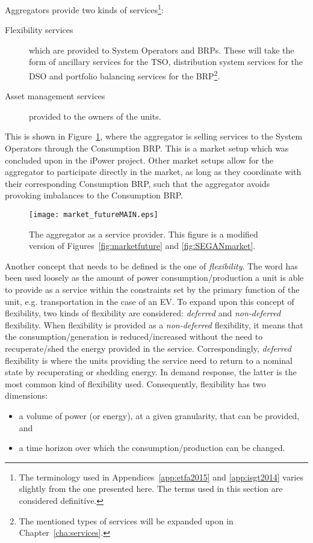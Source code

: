 Aggregators provide two kinds of services\footnote{The terminology used in Appendices~\ref{app:etfa2015} and \ref{app:isgt2014} varies slightly from the one presented here. The terms used in this section are considered definitive.}:
\begin{description}
	\item[Flexibility services] which are provided to System Operators and BRPs. These will take the form of ancillary services for the TSO, distribution system services for the DSO and portfolio balancing services for the BRP\footnote{The mentioned types of services will be expanded upon in Chapter~\ref{cha:services}.}.
	\item[Asset management services] provided to the owners of the units.
\end{description}
This is shown in Figure~\ref{fig:market_futureMAIN}, where the aggregator is selling services to the System Operators through the Consumption BRP. This is a market setup which was concluded upon in the iPower project. Other market setups allow for the aggregator to participate directly in the market, as long as they coordinate with their corresponding Consumption BRP, such that the aggregator avoids provoking imbalances to the Consumption BRP.
\begin{figure}[htbp!]
\centering
\texttt{[image: market\_futureMAIN.eps]}
\caption{The aggregator as a service provider. This figure is a modified version of Figures~\ref{fig:marketfuture} and \ref{fig:SEGANmarket}.}
\label{fig:market_futureMAIN}
\end{figure}

Another concept that needs to be defined is the one of \emph{flexibility}. The word has been used loosely as the amount of power consumption/production a unit is able to provide as a service within the constraints set by the primary function of the unit, e.g. transportation in the case of an EV. To expand upon this concept of flexibility, two kinds of flexibility are considered: \emph{deferred} and \emph{non-deferred} flexibility. When flexibility is provided as a \emph{non-deferred} flexibility,  it means that the consumption/generation is reduced/increased without the need to recuperate/shed the energy provided in the service. Correspondingly, \emph{deferred} flexibility is where the units providing the service need to return to a nominal state by recuperating or shedding energy. In demand response, the latter is the most common kind of flexibility used. Consequently, flexibility has two dimensions:
\begin{itemize}
	\item a volume of power (or energy), at a given granularity, that can be provided, and
	\item a time horizon over which the consumption/production can be changed.
\end{itemize} 

